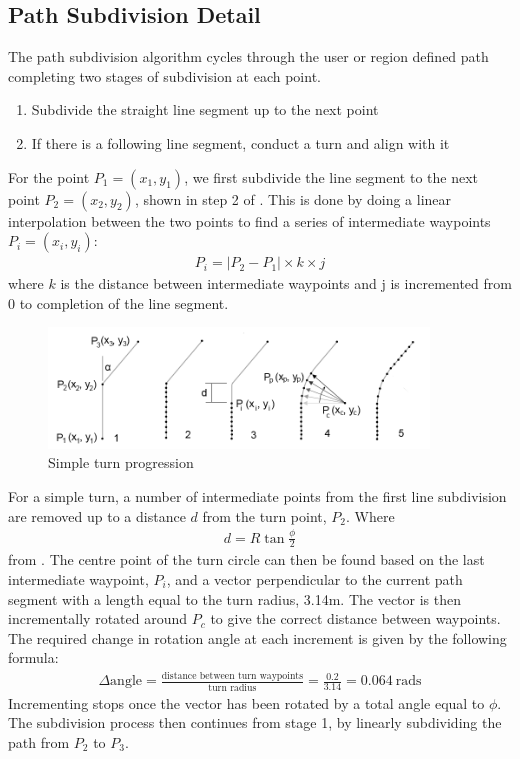 \documentclass[main.tex]{subfiles}
\begin{document}
\begin{appendices}
\chapter{Path Subdivision Detail}
The path subdivision algorithm cycles through the user or region defined path completing two stages of subdivision at each point.
\begin{enumerate}
\item Subdivide the straight line segment up to the next point
\item If there is a following line segment, conduct a turn and align with it
\end{enumerate}
For the point $P_1 = (x_1, y_1)$, we first subdivide the line segment to the next point $P_2 = (x_2, y_2)$, shown in step 2 of . This is done by doing a linear interpolation between the two points to find a series of intermediate waypoints $P_i = (x_i, y_i)$:
\begin{align}
P_i = |P_2 - P_1| \times k \times j
\end{align}
where $k$ is the distance between intermediate waypoints and j is incremented from 0 to completion of the line segment.
\begin{figure}[ht]
\centering
\includegraphics[width=0.9\textwidth]{8-Appendices/simpleTurnProgression.png}
\caption[Simple turn progression]{Simple turn progression}
\end{figure}
For a simple turn, a number of intermediate points from the first line subdivision are removed up to a distance $d$ from the turn point, $P_2$. Where
\begin{align}
d = R \tan \frac{\phi}{2}
\end{align}
from . The centre point of the turn circle can then be found based on the last intermediate waypoint, $P_i$, and a vector perpendicular to the current path segment with a length equal to the turn radius, 3.14m. The vector is then incrementally rotated around $P_c$ to give the correct distance between waypoints. The required change in rotation angle at each increment is given by the following formula:
\begin{align}
\Delta \textrm{angle} = \frac{\textrm{distance between turn waypoints}}{\textrm{turn radius}} = \frac{0.2}{3.14} = 0.064\ \textrm{rads}
\end{align}
Incrementing stops once the vector has been rotated by a total angle equal to $\phi$. The subdivision process then continues from stage 1, by linearly subdividing the path from $P_2$ to $P_3$.


\end{appendices}
\end{document}
